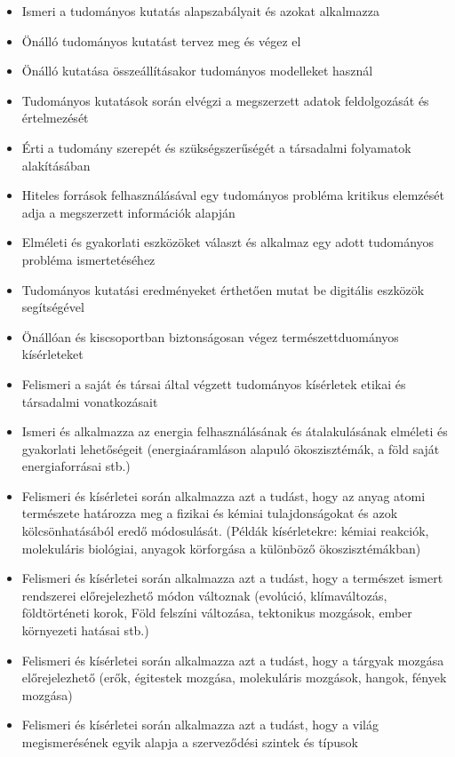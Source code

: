 \begin{itemize}
\item
  Ismeri a tudományos kutatás alapszabályait és azokat alkalmazza
\item
  Önálló tudományos kutatást tervez meg és végez el
\item
  Önálló kutatása összeállításakor tudományos modelleket használ
\item
  Tudományos kutatások során elvégzi a megszerzett adatok feldolgozását
  és értelmezését
\item
  Érti a tudomány szerepét és szükségszerűségét a társadalmi folyamatok
  alakításában
\item
  Hiteles források felhasználásával egy tudományos probléma kritikus
  elemzését adja a megszerzett információk alapján
\item
  Elméleti és gyakorlati eszközöket választ és alkalmaz egy adott
  tudományos probléma ismertetéséhez
\item
  Tudományos kutatási eredményeket érthetően mutat be digitális eszközök
  segítségével
\item
  Önállóan és kiscsoportban biztonságosan végez természettduományos
  kísérleteket
\item
  Felismeri a saját és társai által végzett tudományos kísérletek etikai
  és társadalmi vonatkozásait
\item
  Ismeri és alkalmazza az energia felhasználásának és átalakulásának
  elméleti és gyakorlati lehetőségeit (energiaáramláson alapuló
  ökoszisztémák, a föld saját energiaforrásai stb.)
\item
  Felismeri és kísérletei során alkalmazza azt a tudást, hogy az anyag
  atomi természete határozza meg a fizikai és kémiai tulajdonságokat és
  azok kölcsönhatásából eredő módosulását. (Példák kísérletekre: kémiai
  reakciók, molekuláris biológiai, anyagok körforgása a különböző
  ökoszisztémákban)
\item
  Felismeri és kísérletei során alkalmazza azt a tudást, hogy a
  természet ismert rendszerei előrejelezhető módon változnak (evolúció,
  klímaváltozás, földtörténeti korok, Föld felszíni változása,
  tektonikus mozgások, ember környezeti hatásai stb.)
\item
  Felismeri és kísérletei során alkalmazza azt a tudást, hogy a tárgyak
  mozgása előrejelezhető (erők, égitestek mozgása, molekuláris mozgások,
  hangok, fények mozgása)
\item
  Felismeri és kísérletei során alkalmazza azt a tudást, hogy a világ
  megismerésének egyik alapja a szerveződési szintek és típusok

\end{itemize}
